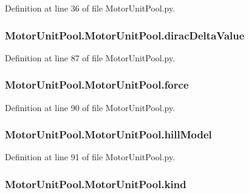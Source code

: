 Definition at line 36 of file Motor\-Unit\-Pool.\-py.

\hypertarget{class_motor_unit_pool_1_1_motor_unit_pool_a48b53d4f838ca8cfe2bc41c8308f2060}{
\subsubsection[{dirac\-Delta\-Value}]{\setlength{\rightskip}{0pt plus 5cm}Motor\-Unit\-Pool.\-Motor\-Unit\-Pool.\-dirac\-Delta\-Value}}\label{class_motor_unit_pool_1_1_motor_unit_pool_a48b53d4f838ca8cfe2bc41c8308f2060}


Definition at line 87 of file Motor\-Unit\-Pool.\-py.

\hypertarget{class_motor_unit_pool_1_1_motor_unit_pool_a97011c17140c45a42a00105279f014ad}{
\subsubsection[{force}]{\setlength{\rightskip}{0pt plus 5cm}Motor\-Unit\-Pool.\-Motor\-Unit\-Pool.\-force}}\label{class_motor_unit_pool_1_1_motor_unit_pool_a97011c17140c45a42a00105279f014ad}


Definition at line 90 of file Motor\-Unit\-Pool.\-py.

\hypertarget{class_motor_unit_pool_1_1_motor_unit_pool_a963061fdcfee8f9dc33e4d6f130ea59b}{
\subsubsection[{hill\-Model}]{\setlength{\rightskip}{0pt plus 5cm}Motor\-Unit\-Pool.\-Motor\-Unit\-Pool.\-hill\-Model}}\label{class_motor_unit_pool_1_1_motor_unit_pool_a963061fdcfee8f9dc33e4d6f130ea59b}


Definition at line 91 of file Motor\-Unit\-Pool.\-py.

\hypertarget{class_motor_unit_pool_1_1_motor_unit_pool_aeb57d0463ad56a16b166d00dc6079b95}{
\subsubsection[{kind}]{\setlength{\rightskip}{0pt plus 5cm}Motor\-Unit\-Pool.\-Motor\-Unit\-Pool.\-kind}}\label{class_motor_unit_pool_1_1_motor_unit_pool_aeb57d0463ad56a16b166d00dc6079b95}


